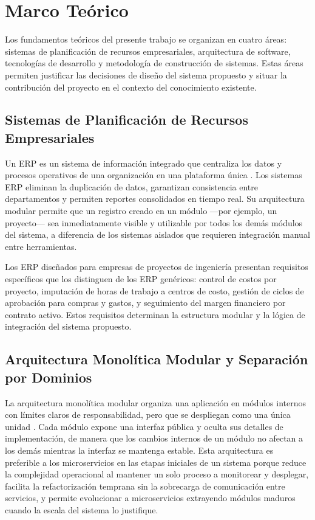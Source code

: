 \documentclass{univalle-perfil}
\begin{document}
\section{Marco Teórico}

Los fundamentos teóricos del presente trabajo se organizan en cuatro áreas: sistemas de planificación de recursos empresariales, arquitectura de software, tecnologías de desarrollo y metodología de construcción de sistemas. Estas áreas permiten justificar las decisiones de diseño del sistema propuesto y situar la contribución del proyecto en el contexto del conocimiento existente.

\subsection{Sistemas de Planificación de Recursos Empresariales}

Un ERP es un sistema de información integrado que centraliza los datos y procesos operativos de una organización en una plataforma única \parencite{monk2012}. Los sistemas ERP eliminan la duplicación de datos, garantizan consistencia entre departamentos y permiten reportes consolidados en tiempo real. Su arquitectura modular permite que un registro creado en un módulo —por ejemplo, un proyecto— sea inmediatamente visible y utilizable por todos los demás módulos del sistema, a diferencia de los sistemas aislados que requieren integración manual entre herramientas.

Los ERP diseñados para empresas de proyectos de ingeniería presentan requisitos específicos que los distinguen de los ERP genéricos: control de costos por proyecto, imputación de horas de trabajo a centros de costo, gestión de ciclos de aprobación para compras y gastos, y seguimiento del margen financiero por contrato activo. Estos requisitos determinan la estructura modular y la lógica de integración del sistema propuesto.

\subsection{Arquitectura Monolítica Modular y Separación por Dominios}

La arquitectura monolítica modular organiza una aplicación en módulos internos con límites claros de responsabilidad, pero que se despliegan como una única unidad \parencite{newman2021}. Cada módulo expone una interfaz pública y oculta sus detalles de implementación, de manera que los cambios internos de un módulo no afectan a los demás mientras la interfaz se mantenga estable. Esta arquitectura es preferible a los microservicios en las etapas iniciales de un sistema porque reduce la complejidad operacional al mantener un solo proceso a monitorear y desplegar, facilita la refactorización temprana sin la sobrecarga de comunicación entre servicios, y permite evolucionar a microservicios extrayendo módulos maduros cuando la escala del sistema lo justifique.
\end{document}
